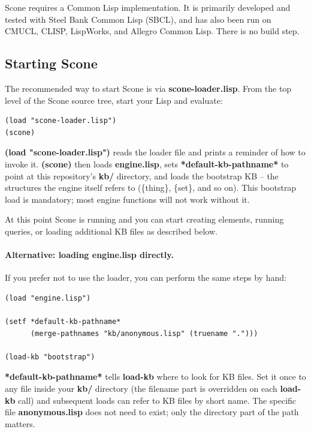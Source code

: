 \documentclass[titlepage,twoside,openright,11pt]{article}
\begin{document}
Scone requires a Common Lisp implementation. It is primarily developed
and tested with Steel Bank Common Lisp (SBCL), and has also been run on
CMUCL, CLISP, LispWorks, and Allegro Common Lisp. There is no build
step.

\subsection{Starting Scone}\label{starting-scone}

The recommended way to start Scone is via \textbf{scone-loader.lisp}.
From the top level of the Scone source tree, start your Lisp and
evaluate:

\begin{verbatim}
(load "scone-loader.lisp")
(scone)
\end{verbatim}

\textbf{(load "scone-loader.lisp")} reads the loader file and prints a
reminder of how to invoke it. \textbf{(scone)} then loads
\textbf{engine.lisp}, sets \textbf{*default-kb-pathname*} to point at
this repository's \textbf{kb/} directory, and loads the bootstrap KB --
the structures the engine itself refers to (\{thing\}, \{set\}, and so
on). This bootstrap load is mandatory; most engine functions will not
work without it.

At this point Scone is running and you can start creating elements,
running queries, or loading additional KB files as described below.

\paragraph{Alternative: loading engine.lisp directly.} If you prefer
not to use the loader, you can perform the same steps by hand:

\begin{verbatim}
(load "engine.lisp")

(setf *default-kb-pathname*
      (merge-pathnames "kb/anonymous.lisp" (truename ".")))

(load-kb "bootstrap")
\end{verbatim}

\textbf{*default-kb-pathname*} tells \textbf{load-kb} where to look for
KB files. Set it once to any file inside your \textbf{kb/} directory
(the filename part is overridden on each \textbf{load-kb} call) and
subsequent loads can refer to KB files by short name. The specific file
\textbf{anonymous.lisp} does not need to exist; only the directory part
of the path matters.
\end{document}
